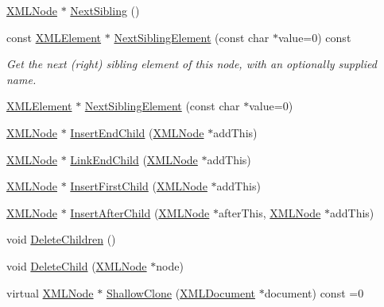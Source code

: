 \begin{DoxyCompactItemize}
\hyperlink{classtinyxml2_1_1_x_m_l_node}{X\+M\+L\+Node} $\ast$ \hyperlink{classtinyxml2_1_1_x_m_l_node_aeb7d4dfd8fb924ef86e7cb72183acbac}{Next\+Sibling} ()
\item 
const \hyperlink{classtinyxml2_1_1_x_m_l_element}{X\+M\+L\+Element} $\ast$ \hyperlink{classtinyxml2_1_1_x_m_l_node_a490e166c3a1c6607960bfa9c112d3d30}{Next\+Sibling\+Element} (const char $\ast$value=0) const 
\begin{DoxyCompactList}\small\item\em Get the next (right) sibling element of this node, with an optionally supplied name. \end{DoxyCompactList}\item 
\hyperlink{classtinyxml2_1_1_x_m_l_element}{X\+M\+L\+Element} $\ast$ \hyperlink{classtinyxml2_1_1_x_m_l_node_acf735bf653016792522305d8ad4b3029}{Next\+Sibling\+Element} (const char $\ast$value=0)
\item 
\hyperlink{classtinyxml2_1_1_x_m_l_node}{X\+M\+L\+Node} $\ast$ \hyperlink{classtinyxml2_1_1_x_m_l_node_ae3b422e98914d6002ca99bb1d2837103}{Insert\+End\+Child} (\hyperlink{classtinyxml2_1_1_x_m_l_node}{X\+M\+L\+Node} $\ast$add\+This)
\item 
\hyperlink{classtinyxml2_1_1_x_m_l_node}{X\+M\+L\+Node} $\ast$ \hyperlink{classtinyxml2_1_1_x_m_l_node_a663e3a5a378169fd477378f4d17a7649}{Link\+End\+Child} (\hyperlink{classtinyxml2_1_1_x_m_l_node}{X\+M\+L\+Node} $\ast$add\+This)
\item 
\hyperlink{classtinyxml2_1_1_x_m_l_node}{X\+M\+L\+Node} $\ast$ \hyperlink{classtinyxml2_1_1_x_m_l_node_ac609a8f3ea949027f439280c640bbaf2}{Insert\+First\+Child} (\hyperlink{classtinyxml2_1_1_x_m_l_node}{X\+M\+L\+Node} $\ast$add\+This)
\item 
\hyperlink{classtinyxml2_1_1_x_m_l_node}{X\+M\+L\+Node} $\ast$ \hyperlink{classtinyxml2_1_1_x_m_l_node_a9275138a1b8dd5d8e2c26789bdc23ac8}{Insert\+After\+Child} (\hyperlink{classtinyxml2_1_1_x_m_l_node}{X\+M\+L\+Node} $\ast$after\+This, \hyperlink{classtinyxml2_1_1_x_m_l_node}{X\+M\+L\+Node} $\ast$add\+This)
\item 
void \hyperlink{classtinyxml2_1_1_x_m_l_node_a0360085cc54df5bff85d5c5da13afdce}{Delete\+Children} ()
\item 
void \hyperlink{classtinyxml2_1_1_x_m_l_node_a363b6edbd6ebd55f8387d2b89f2b0921}{Delete\+Child} (\hyperlink{classtinyxml2_1_1_x_m_l_node}{X\+M\+L\+Node} $\ast$node)
\item 
virtual \hyperlink{classtinyxml2_1_1_x_m_l_node}{X\+M\+L\+Node} $\ast$ \hyperlink{classtinyxml2_1_1_x_m_l_node_a8402cbd3129d20e9e6024bbcc0531283}{Shallow\+Clone} (\hyperlink{classtinyxml2_1_1_x_m_l_document}{X\+M\+L\+Document} $\ast$document) const =0

\end{DoxyCompactItemize}
